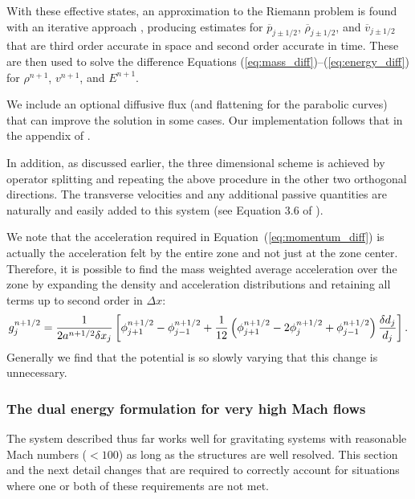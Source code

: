 With these effective states, an approximation to the Riemann problem is found
with an iterative approach \citep[see][and section~\ref{sec.riemann}]{Woodward86}, producing estimates for 
$\overline{p}_{j\pm 1/2}$, $\overline{\rho}_{j\pm1/2}$, and $\overline{v}_{j\pm 1/2}$ that are third order
accurate in space and second order accurate in time.  These are then
used to solve the difference Equations (\ref{eq:mass_diff})--(\ref{eq:energy_diff}) for $\rho^{n+1}$, $v^{n+1}$, and $E^{n+1}$.

We include an optional diffusive flux (and flattening for the parabolic curves) that can improve the solution in some cases.  Our implementation follows that in the appendix of \citet{1984JCoPh..54..174C}.

In addition, as discussed earlier, the three dimensional scheme is achieved by operator splitting and repeating the above procedure in the other two orthogonal directions.  The transverse velocities and any additional passive quantities are naturally and easily added to this system (see Equation 3.6 of \citet{1984JCoPh..54..174C}).  

We note that the acceleration required in Equation~(\ref{eq:momentum_diff}) is actually the
acceleration felt by the entire zone and not just at the zone center.
Therefore, it is possible to find the mass weighted average acceleration over the zone
by expanding the density and acceleration distributions and
retaining all terms up to second order in $\Delta x$:
%
\begin{equation}
g_j^{n+1/2} = 
       \frac{1}{2 a^{n+1/2} \delta x_j} \left[ 
             \phi_{j+1}^{n+1/2} 
           - \phi_{j-1}^{n+1/2} 
           + \frac{1}{12} \left(    \phi^{n+1/2}_{j+1} 
                                 - 2\phi^{n+1/2}_j 
                                 + \phi^{n+1/2}_{j-1} \right) 
                                   {\delta d_j \over d_j}
       \right].
       \label{eq:accel}
\end{equation}
Generally we find that the potential is so slowly varying that this change is unnecessary.


\subsubsection{The dual energy formulation for  very high Mach flows} %

The system described thus far works well for gravitating systems with
reasonable Mach numbers ($<100$) as long as the structures are well resolved.
This section and the next detail changes that are required
to correctly account for situations where one or both of these
requirements are not met.


